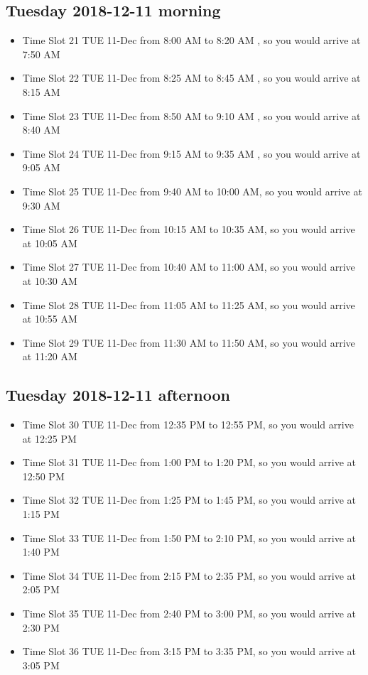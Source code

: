 \documentclass[]{book}
\providecommand{\tightlist}{%
  \setlength{\itemsep}{0pt}\setlength{\parskip}{0pt}}
\theoremstyle{definition}
\theoremstyle{definition}
\theoremstyle{definition}
\theoremstyle{remark}
\begin{document}
\hypertarget{tuesday-2018-12-11-morning}{%
\subsection{Tuesday 2018-12-11
morning}\label{tuesday-2018-12-11-morning}}

\begin{itemize}
\tightlist
\item
  Time Slot 21 TUE 11-Dec from 8:00 AM to 8:20 AM , so you would arrive
  at 7:50 AM
\item
  Time Slot 22 TUE 11-Dec from 8:25 AM to 8:45 AM , so you would arrive
  at 8:15 AM
\item
  Time Slot 23 TUE 11-Dec from 8:50 AM to 9:10 AM , so you would arrive
  at 8:40 AM
\item
  Time Slot 24 TUE 11-Dec from 9:15 AM to 9:35 AM , so you would arrive
  at 9:05 AM
\item
  Time Slot 25 TUE 11-Dec from 9:40 AM to 10:00 AM, so you would arrive
  at 9:30 AM
\item
  Time Slot 26 TUE 11-Dec from 10:15 AM to 10:35 AM, so you would arrive
  at 10:05 AM
\item
  Time Slot 27 TUE 11-Dec from 10:40 AM to 11:00 AM, so you would arrive
  at 10:30 AM
\item
  Time Slot 28 TUE 11-Dec from 11:05 AM to 11:25 AM, so you would arrive
  at 10:55 AM
\item
  Time Slot 29 TUE 11-Dec from 11:30 AM to 11:50 AM, so you would arrive
  at 11:20 AM
\end{itemize}

\hypertarget{tuesday-2018-12-11-afternoon}{%
\subsection{Tuesday 2018-12-11
afternoon}\label{tuesday-2018-12-11-afternoon}}

\begin{itemize}
\tightlist
\item
  Time Slot 30 TUE 11-Dec from 12:35 PM to 12:55 PM, so you would arrive
  at 12:25 PM
\item
  Time Slot 31 TUE 11-Dec from 1:00 PM to 1:20 PM, so you would arrive
  at 12:50 PM
\item
  Time Slot 32 TUE 11-Dec from 1:25 PM to 1:45 PM, so you would arrive
  at 1:15 PM
\item
  Time Slot 33 TUE 11-Dec from 1:50 PM to 2:10 PM, so you would arrive
  at 1:40 PM
\item
  Time Slot 34 TUE 11-Dec from 2:15 PM to 2:35 PM, so you would arrive
  at 2:05 PM
\item
  Time Slot 35 TUE 11-Dec from 2:40 PM to 3:00 PM, so you would arrive
  at 2:30 PM
\item
  Time Slot 36 TUE 11-Dec from 3:15 PM to 3:35 PM, so you would arrive
  at 3:05 PM
\end{itemize}
\end{document}
